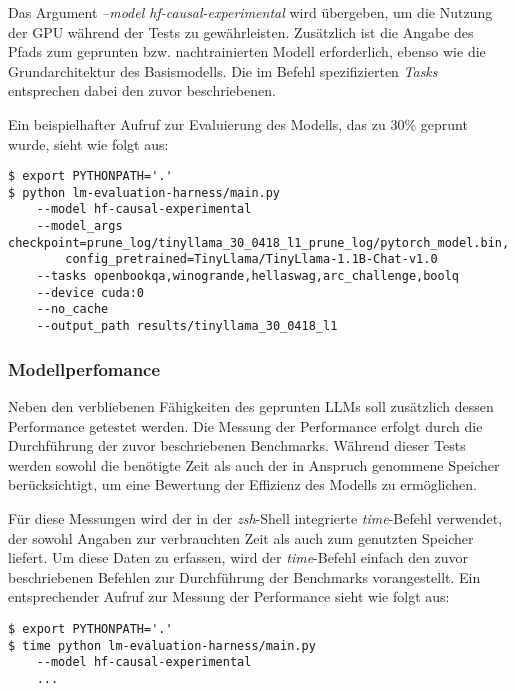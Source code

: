 Das Argument \emph{--model hf-causal-experimental} wird übergeben, um die
Nutzung der GPU während der Tests zu gewährleisten. Zusätzlich ist die Angabe
des Pfads zum geprunten bzw. nachtrainierten Modell erforderlich, ebenso wie die
Grundarchitektur des Basismodells. Die im Befehl spezifizierten \emph{Tasks}
entsprechen dabei den zuvor beschriebenen.

Ein beispielhafter Aufruf zur Evaluierung des Modells, das zu 30\% geprunt wurde,
sieht wie folgt aus:

\vspace{1em}
\begin{lstlisting}
$ export PYTHONPATH='.'
$ python lm-evaluation-harness/main.py
    --model hf-causal-experimental
    --model_args checkpoint=prune_log/tinyllama_30_0418_l1_prune_log/pytorch_model.bin,
        config_pretrained=TinyLlama/TinyLlama-1.1B-Chat-v1.0
    --tasks openbookqa,winogrande,hellaswag,arc_challenge,boolq
    --device cuda:0
    --no_cache
    --output_path results/tinyllama_30_0418_l1
\end{lstlisting}

\subsubsection{Modellperfomance}

Neben den verbliebenen Fähigkeiten des geprunten LLMs soll zusätzlich dessen
Performance getestet werden. Die Messung der Performance erfolgt durch die
Durchführung der zuvor beschriebenen Benchmarks. Während dieser Tests werden
sowohl die benötigte Zeit als auch der in Anspruch genommene Speicher
berücksichtigt, um eine Bewertung der Effizienz des Modells zu ermöglichen.

Für diese Messungen wird der in der \emph{zsh}-Shell integrierte
\emph{time}-Befehl verwendet, der sowohl Angaben zur verbrauchten Zeit als auch
zum genutzten Speicher liefert. Um diese Daten zu erfassen, wird der
\emph{time}-Befehl einfach den zuvor beschriebenen Befehlen zur Durchführung der
Benchmarks vorangestellt. Ein entsprechender Aufruf zur Messung der Performance
sieht wie folgt aus:

\vspace{1em}
\begin{lstlisting}
$ export PYTHONPATH='.'
$ time python lm-evaluation-harness/main.py
    --model hf-causal-experimental
    ...
\end{lstlisting}

\newpage
